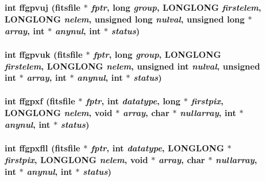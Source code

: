 \subsubsection{\setlength{\rightskip}{0pt plus 5cm}int ffgpvuj (\bf{fitsfile} $\ast$ {\em fptr}, long {\em group}, \bf{LONGLONG} {\em firstelem}, \bf{LONGLONG} {\em nelem}, unsigned long {\em nulval}, unsigned long $\ast$ {\em array}, int $\ast$ {\em anynul}, int $\ast$ {\em status})}\label{src_2fitsio_8h_d3a92390525cbe896595a5e30e2c31cb}


\subsubsection{\setlength{\rightskip}{0pt plus 5cm}int ffgpvuk (\bf{fitsfile} $\ast$ {\em fptr}, long {\em group}, \bf{LONGLONG} {\em firstelem}, \bf{LONGLONG} {\em nelem}, unsigned int {\em nulval}, unsigned int $\ast$ {\em array}, int $\ast$ {\em anynul}, int $\ast$ {\em status})}\label{src_2fitsio_8h_9d63a49944e89d4debca1080067ca58f}


\subsubsection{\setlength{\rightskip}{0pt plus 5cm}int ffgpxf (\bf{fitsfile} $\ast$ {\em fptr}, int {\em datatype}, long $\ast$ {\em firstpix}, \bf{LONGLONG} {\em nelem}, void $\ast$ {\em array}, char $\ast$ {\em nullarray}, int $\ast$ {\em anynul}, int $\ast$ {\em status})}\label{src_2fitsio_8h_64917e68aaefb305612dd26f21565443}


\subsubsection{\setlength{\rightskip}{0pt plus 5cm}int ffgpxfll (\bf{fitsfile} $\ast$ {\em fptr}, int {\em datatype}, \bf{LONGLONG} $\ast$ {\em firstpix}, \bf{LONGLONG} {\em nelem}, void $\ast$ {\em array}, char $\ast$ {\em nullarray}, int $\ast$ {\em anynul}, int $\ast$ {\em status})}\label{src_2fitsio_8h_1695916e97fed43202efca40fd7fd573}


